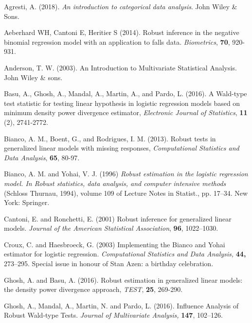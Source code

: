 \documentclass[a4paper]{article}%
\begin{document}
\begin{thebibliography}{99}                                                                                               



Agresti, A. (2018). \textit{An introduction to categorical data analysis}. 
John Wiley \& Sons.


Aeberhard WH, Cantoni E, Heritier S (2014). Robust inference in the negative binomial regression
model with an application to falls data. \textit{Biometrics}, \textbf{70}, 920-931.


 Anderson, T. W. (2003). An Introduction to Multivariate Statistical Analysis. John Wiley \& sons.

Basu, A., Ghosh, A., Mandal, A., Martin, A., and Pardo, L.
(2016). A Wald-type test statistic for testing linear hypothesis in logistic
regression models based on minimum density power divergence estimator,
\textit{Electronic Journal of Statistics},  \textbf{11} (2), 2741-2772.

Bianco, A. M., Boent, G., and Rodrigues, I. M. (2013). Robust
tests in generalized linear models with missing responses,
\textit{Computational Statistics and Data Analysis}, \textbf{65}, 80-97.

Bianco, A. M. and Yohai, V. J. (1996) \textit{Robust estimation
in the logistic regression model. In Robust statistics, data analysis, and
computer intensive methods} (Schloss Thurnau, 1994), volume 109 of Lecture
Notes in Statist., pp. 17--34. New York: Springer.

Cantoni, E. and Ronchetti, E. (2001) Robust inference for
generalized linear models.\textit{ Journal of the American Statistical
Association}, \textbf{96}, 1022--1030.

Croux, C. and Haesbroeck, G. (2003) Implementing the Bianco and
Yohai estimator for logistic regression. \textit{Computational Statistics and
Data Analysis,} \textbf{44, } 273--295. Special issue in honour of Stan Azen:
a birthday celebration.

Ghosh, A. and Basu, A. (2016). Robust estimation in generalized
linear models: the density power divergence approach, \textit{TEST},
\textbf{25}, 269-290.

Ghosh, A., Mandal, A., Martin, N. and Pardo, L. (2016).
Influence Analysis of Robust Wald-type Tests. \textit{Journal of Multivariate
Analysis,} \textbf{147}, 102--126.


\end{thebibliography}
\end{document}
